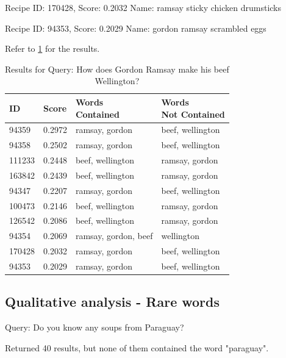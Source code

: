 \documentclass[a4paper,11pt]{article}
\begin{document}
Recipe ID: 170428, Score: 0.2032
Name: ramsay sticky chicken drumsticks

Recipe ID: 94353, Score: 0.2029
Name: gordon ramsay scrambled eggs

Refer to \ref{tab:beef_wellington} for the results.

\begin{table}
    \centering
    \begin{tabular}{|l|l|l|l|}
        \hline
        \textbf{ID} & \textbf{Score} & \makecell{Words                         \\Contained} & \makecell{Words\\Not Contained} \\ \hline
        94359       & 0.2972         & ramsay, gordon       & beef, wellington \\ \hline
        94358       & 0.2502         & ramsay, gordon       & beef, wellington \\ \hline
        111233      & 0.2448         & beef, wellington     & ramsay, gordon   \\ \hline
        163842      & 0.2439         & beef, wellington     & ramsay, gordon   \\ \hline
        94347       & 0.2207         & ramsay, gordon       & beef, wellington \\ \hline
        100473      & 0.2146         & beef, wellington     & ramsay, gordon   \\ \hline
        126542      & 0.2086         & beef, wellington     & ramsay, gordon   \\ \hline
        94354       & 0.2069         & ramsay, gordon, beef & wellington       \\ \hline
        170428      & 0.2032         & ramsay, gordon       & beef, wellington \\ \hline
        94353       & 0.2029         & ramsay, gordon       & beef, wellington \\ \hline
    \end{tabular}
    \caption{Results for Query: How does Gordon Ramsay make his beef Wellington?}
    \label{tab:beef_wellington}
\end{table}


\subsection{Qualitative analysis - Rare words}
Query: Do you know any soups from Paraguay?

Returned 40 results, but none of them contained the word "paraguay".
\end{document}
